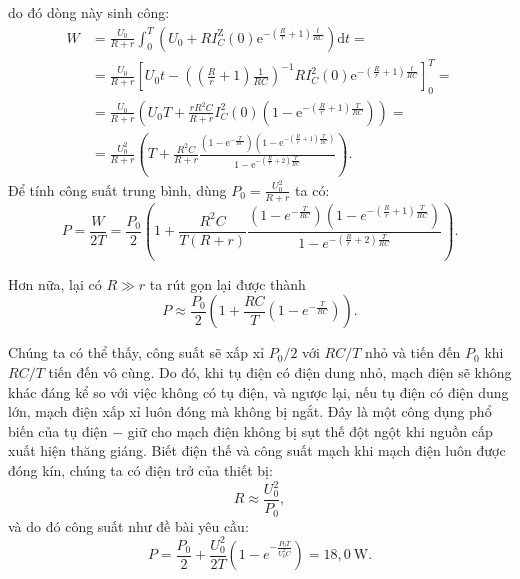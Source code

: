 \begin{loigiai}
do đó dòng này sinh công:
   \[\begin{aligned}
W &=\frac{U_{0}}{R+r} \int_{0}^{T}\left(U_{0}+R I_{C}^{\mathrm{Z}}(0) \mathrm{e}^{-\left(\frac{R}{r}+1\right) \frac{t}{R C}}\right) \mathrm{d} t=\\
&=\frac{U_{0}}{R+r}\left[U_{0} t-\left(\left(\frac{R}{r}+1\right) \frac{1}{R C}\right)^{-1} R I_{C}^{2}(0) \mathrm{e}^{-\left(\frac{R}{r}+1\right) \frac{t}{R C}}\right]_{0}^{T}=\\
&=\frac{U_{0}}{R+r}\left(U_{0} T+\frac{r R^{2} C}{R+r} I_{C}^{2}(0)\left(1-\mathrm{e}^{-\left(\frac{R}{r}+1\right) \frac{T}{R C}}\right)\right)=\\
&=\frac{U_{0}^{2}}{R+r}\left(T+\frac{R^{2} C}{R+r} \frac{\left(1-\mathrm{e}^{-\frac{T}{R C}}\right)\left(1-\mathrm{e}^{\left.-\left(\frac{R}{r}+1\right) \frac{T}{R C}\right)}\right.}{1-\mathrm{e}^{-\left(\frac{R}{r}+2\right) \frac{T}{R C}}}\right) .
\end{aligned}\]
Để tính công suất trung bình, dùng $P_0 = \frac{U_0^2}{R+r}$ ta có:
  \[ P = \frac{W}{2T} = \frac{P_0}{2} \left(1 + \frac{R^2 C}{T(R+r)} \frac{\left(1 - e^{-\frac{T}{RC} }\right) \left(1 - e^{-(\frac{R}{r} +1) \frac{T}{RC}}\right) }{1 - e^{-(\frac{R}{r} +2) \frac{T}{RC}}} \right).\]

Hơn nữa, lại có $R \gg r$ ta rút gọn lại được thành
    \[ P \approx \frac{P_0}{2} \left( 1 + \frac{RC}{T} \left(1 - e^{-\frac{T}{RC}}\right)\right) .\]

Chúng ta có thể thấy, công suất sẽ xấp xỉ $P_0/2$ với $RC/T$ nhỏ và tiến đến $P_0$ khi $RC/T$ tiến đến vô cùng. Do đó, khi tụ điện có điện dung nhỏ, mạch điện sẽ không khác đáng kể so với việc không có tụ điện, và ngược lại, nếu tụ điện có điện dung lớn, mạch điện xấp xỉ luôn đóng mà không bị ngắt. Đây là một công dụng phổ biến của tụ điện $-$ giữ cho mạch điện không bị sụt thế đột ngột khi nguồn cấp xuất hiện thăng giáng. Biết điện thế và công suất mạch khi mạch điện luôn được đóng kín, chúng ta có điện trở của thiết bị:
      \[ R \approx \frac{U_0^2}{P_0} ,\]
và do đó công suất như đề bài yêu cầu:
         \[ P =\frac{P_0}{2} + \frac{U_0^2}{2T} \left( 1 - e^{-\frac{P_0T}{U_0^2 C}} \right) = 18,0 ~\mathrm{W} . \]

\end{loigiai}


